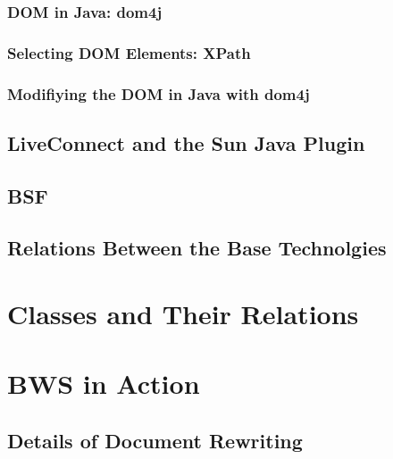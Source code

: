     
    
   \subsubsection{DOM in Java: dom4j}
    
    
    
   \subsubsection{Selecting DOM Elements: XPath}
    \label{sec:SelectingDOMElementsXPath}
    
   
   \subsubsection{Modifiying the DOM in Java with dom4j}
   
    
    
  \subsection{LiveConnect and the Sun Java Plugin}
   \label{sec:liveconnect}  
   
   
  \subsection{BSF}
  
   
  
  \subsection{Relations Between the Base Technolgies}
   
   
   
 \section{Classes and Their Relations}
 
  
   
 \section{BWS in Action}
  
  
  
  \subsection{Details of Document Rewriting}
  
